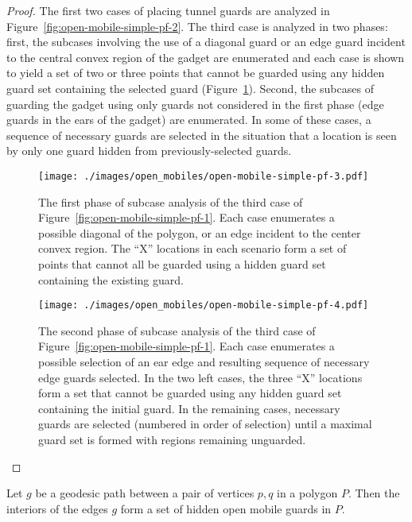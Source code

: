 \documentclass{cccg12}
\begin{document}
\begin{proof}
The first two cases of placing tunnel guards are analyzed in Figure~\ref{fig:open-mobile-simple-pf-2}.
The third case is analyzed in two phases: first, the subcases involving the use of a diagonal guard or an edge guard incident to the central convex region of the gadget are enumerated and each case is shown to yield a set of two or three points that cannot be guarded using any hidden guard set containing the selected guard (Figure~\ref{fig:open-mobile-simple-pf-3}).
Second, the subcases of guarding the gadget using only guards not considered in the first phase (edge guards in the ears of the gadget) are enumerated.
In some of these cases, a sequence of necessary guards are selected in the situation that a location is seen by only one guard hidden from previously-selected guards.
 
\begin{figure}[ht]
\centering
\texttt{[image: ./images/open\_mobiles/open-mobile-simple-pf-3.pdf]}
\caption{The first phase of subcase analysis of the third case of Figure~\ref{fig:open-mobile-simple-pf-1}.
Each case enumerates a possible diagonal of the polygon, or an edge incident to the center convex region.
The ``X'' locations in each scenario form a set of points that cannot all be guarded using a hidden guard set containing the existing guard.}
\label{fig:open-mobile-simple-pf-3}
\end{figure}

\begin{figure}[ht]
\centering
\texttt{[image: ./images/open\_mobiles/open-mobile-simple-pf-4.pdf]}
\caption{The second phase of subcase analysis of the third case of Figure~\ref{fig:open-mobile-simple-pf-1}.
Each case enumerates a possible selection of an ear edge and resulting sequence of necessary edge guards selected.
In the two left cases, the three ``X'' locations form a set that cannot be guarded using any hidden guard set containing the initial guard.
In the remaining cases, necessary guards are selected (numbered in order of selection) until a maximal guard set is formed with regions remaining unguarded.}
\label{fig:open-mobile-simple-pf-4}
\end{figure}

\end{proof}

\begin{obs}
\label{obs:geodesic-hidden}
Let $g$ be a geodesic path between a pair of vertices $p, q$ in a polygon $P$.
Then the interiors of the edges $g$ form a set of hidden open mobile guards in $P$.
\end{obs}
\end{document}
